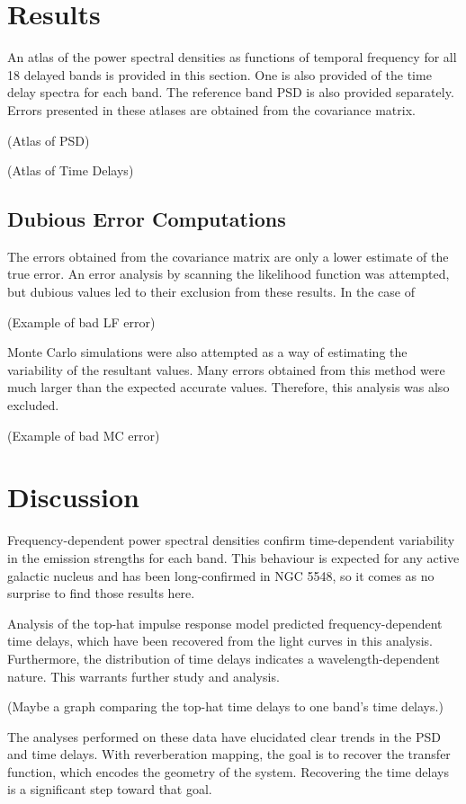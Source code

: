 \documentclass[11pt,letterpaper]{article}
\begin{document}
\section{Results}
\label{results}

	An atlas of the power spectral densities as functions
	of temporal	frequency for all 18 delayed bands is provided in this section.
	One is also provided of the time delay spectra for each band. The reference
	band PSD is also provided separately. Errors presented in these atlases
	are obtained from the covariance matrix.

	(Atlas of PSD)

	(Atlas of Time Delays)

	\subsection{Dubious Error Computations}
	The errors obtained from the covariance matrix are only a lower estimate
	of the true error. An error analysis by scanning the likelihood function
	was attempted, but dubious values led to their exclusion from these results.
	In the case of

	(Example of bad LF error)

	Monte Carlo simulations were also attempted as a way of estimating the
	variability of the resultant values. Many errors obtained from this method
	were much larger than the expected accurate values. Therefore, this analysis
	was also excluded.

	(Example of bad MC error)


\section{Discussion}
Frequency-dependent power spectral densities confirm time-dependent variability
in the emission strengths for each band. This behaviour is expected for
any active galactic nucleus and has been long-confirmed in NGC 5548, so
it comes as no surprise to find those results here. 

Analysis of the top-hat impulse response model predicted frequency-dependent
time delays, which have been recovered from the light curves in this analysis.
Furthermore, the distribution of time delays indicates a wavelength-dependent
nature. This warrants further study and analysis.

(Maybe a graph comparing the top-hat time delays to one band's time delays.)

The analyses performed on these data have elucidated clear trends in the PSD
and time delays. With reverberation mapping, the goal is to recover the transfer
function, which encodes the geometry of the system. Recovering the time delays
is a significant step toward that goal. 
\end{document}
